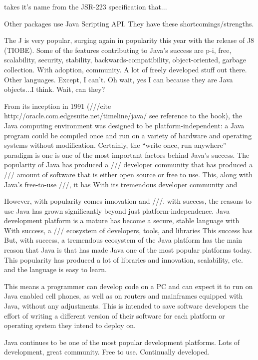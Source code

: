  takes it's name from the JSR-223 specification that...

Other packages use Java Scripting API. They have these shortcomings/strengths.


The J is very popular, surging again in popularity this year with the release of J8 (TIOBE). Some of the features contributing to Java's success are p-i, free, scalability, security, stability, backwards-compatibility, object-oriented, garbage collection. With adoption, community. A lot of freely developed stuff out there. Other languages. Except, I can't. Oh wait, yes I can because they are Java objects...I think. Wait, can they?

From its inception in 1991 (///cite http://oracle.com.edgesuite.net/timeline/java/  see reference to the book), the Java computing environment was designed to be platform-independent: a Java program could be compiled once and run on a variety of hardware and operating systems without modification. Certainly, the ``write once, run anywhere'' paradigm is one is one of the most important factors behind Java's success. The popularity of Java has produced a /// developer community that has produced a /// amount of software that is either open source or free to use. This, along with Java's free-to-use ///, it has With its tremendous developer community and 

However, with popularity comes innovation and ///.
with success, the reasons to use Java has grown significantly beyond just platform-independence. Java development platform is a mature has become a secure, stable language with With success, a /// ecosystem of developers, tools, and libraries This success has  But, with success, a tremendous ecosystem of  the Java platform has  the main reason that Java is that has made Java one of the most popular platforms today. This popularity has produced a lot of libraries and innovation, scalability, etc. and the language is easy to learn.

This means a programmer can develop code on a PC and can expect it to run on Java enabled cell phones, as well as on routers and mainframes equipped with Java, without any adjustments. This is intended to save software developers the effort of writing a different version of their software for each platform or operating system they intend to deploy on.

Java continues to be one of the most popular development platforms. Lots of development, great community.
Free to use.
Continually developed.

